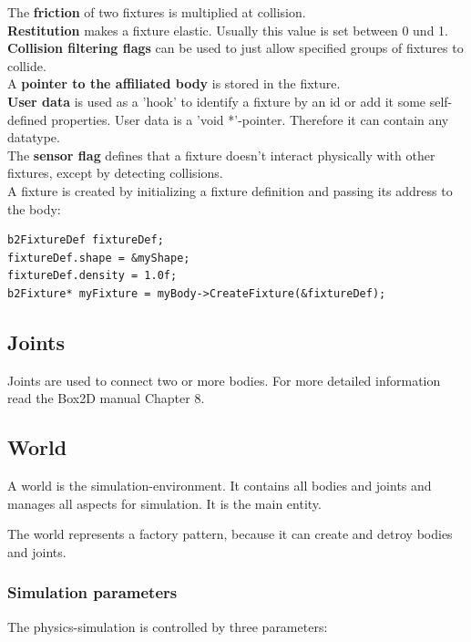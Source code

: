 \documentclass[10pt,a4paper,DIV=11]{scrreprt}
\begin{document}
The \textbf{friction} of two fixtures is multiplied at collision. \\

\textbf{Restitution} makes a fixture elastic. Usually this value is set between 0 und 1. \\

\textbf{Collision filtering flags} can be used to just allow specified groups of fixtures to collide. \\

A \textbf{pointer to the affiliated body} is stored in the fixture.\\

\textbf{User data} is used as a 'hook' to identify a fixture by an id or add it some self-defined properties. User data is a 'void *'-pointer. Therefore it can contain any datatype. \\

The \textbf{sensor flag} defines that a fixture doesn't interact physically with other fixtures, except by detecting collisions. \\



A fixture is created by initializing a fixture definition and passing its address to the body:

\begin{lstlisting}[caption={Creation of a fixture (source Box2D manual)},label=lst:fixture-create]
b2FixtureDef fixtureDef;
fixtureDef.shape = &myShape;
fixtureDef.density = 1.0f;
b2Fixture* myFixture = myBody->CreateFixture(&fixtureDef);
\end{lstlisting}


\subsection{Joints}
Joints are used to connect two or more bodies. For more detailed information read the Box2D manual Chapter 8.

\subsection{World}
A world is the simulation-environment. It contains all bodies and joints and manages all aspects for simulation. It is the main entity.

The world represents a factory pattern, because it can create and detroy bodies and joints.

\subsubsection*{Simulation parameters}
The physics-simulation is controlled by three parameters: \\
\end{document}

